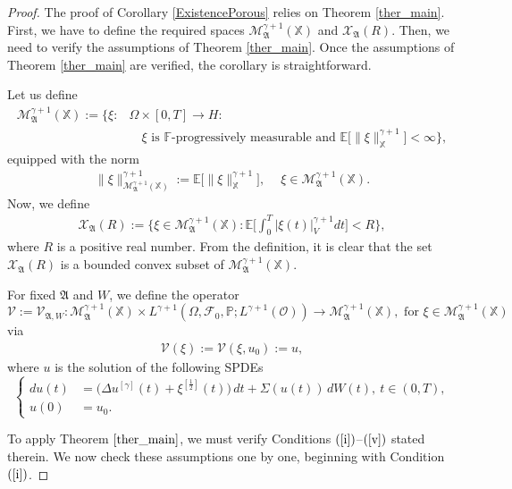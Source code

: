 \documentclass[english,a4paper,11pt]{amsart}
\theoremstyle{plain}
\theoremstyle{definition}
\theoremstyle{remark}
\numberwithin{equation}{section}
\newcommand{\MA}{\mathfrak{A}}
\newcommand{\CO}{{{ \mathcal O }}}
\newcommand{\EE}{ \mathbb{E} }
\newcommand{\Mcal} {{\mathcal M}}
\newcommand{\Vcal} {{\mathcal V}}
\newcommand{\Xcal} {{\mathcal X}}
\newcommand{\Afrak} {{\mathfrak A}}
\renewcommand{\P}{\mathbb{P}}
\newcommand{\X}{\mathbb{X}}
\begin{document}
\begin{proof} The proof of Corollary \ref{ExistencePorous} relies on Theorem \ref{ther_main}. First, we have to define the required spaces $\mathcal{M}_\MA^{\gamma+1}(\X)$ and $\mathcal{X}_\MA(R)$. Then, we need to verify the assumptions of Theorem \ref{ther_main}. Once the assumptions of Theorem \ref{ther_main} are verified, the corollary is straightforward.


Let us define 
\begin{align*}
\Mcal_{\Afrak}^{\gamma+1}(\X) := \big\{ \xi:&\Omega \times [0,T]\to H: \\& \quad \xi \text{ is $\mathbb{F}$-progressively measurable and } \EE\big[\|\xi\|_{\X}^{\gamma+1}\big]<\infty\big\},
\end{align*}equipped with the norm 
\begin{align*}
	\|\xi\|_{\Mcal_{\Afrak}^{\gamma+1}(\X)}^{\gamma+1}:=\EE\big[\|\xi\|_{\X}^{\gamma+1}\big], \ \quad \xi\in \Mcal_{\Afrak}^{\gamma+1}(\X).
\end{align*}Now, we define 
\begin{align*}
	\Xcal_\Afrak(R):=\bigg\{\xi \in \Mcal_\Afrak^{\gamma+1}(\X):\EE\bigg[\int_0^T  |\xi(t)|_{V}^{\gamma+1}d t \bigg]<R \bigg\},
\end{align*}where $R$ is a positive real number. From the definition, it is clear that the set $\Xcal_\Afrak(R)$ is a bounded convex subset of $\Mcal_\Afrak^{\gamma+1}(\X)$.

For fixed $\Afrak$ and $W$, we define the operator $$\Vcal:=\Vcal_{\Afrak,W}:\Mcal_{\Afrak}^{\gamma+1}(\X)\times L^{\gamma+1}(\Omega,\mathcal{F}_0,\P;L^{\gamma+1}(\CO))\to \Mcal_{\Afrak}^{\gamma+1}(\X), \text{ for } \xi\in \Mcal_{\Afrak}^{\gamma+1}(\X)$$ via
\begin{align*}
	\Vcal(\xi):=\Vcal(\xi,u_0):=u, 
\end{align*}where $u$ is the solution of the following SPDEs
\begin{equation}\label{E21}
	\left\{
	\begin{aligned}
		d u(t)&= \big(\Delta u^{[\gamma]}(t)+\xi^{[\frac{1}{2}]}(t)\big)\, d t+\Sigma(u(t))\, dW(t), \ t\in (0,T),\\
		u(0)&=u_0.
	\end{aligned}
	\right.
\end{equation}



To apply Theorem $\ref{ther_main}$, we must verify Conditions $(\ref{i})$–$(\ref{v})$ stated therein. We now check these assumptions one by one, beginning with Condition $(\ref{i})$.



\end{proof}
\end{document}
